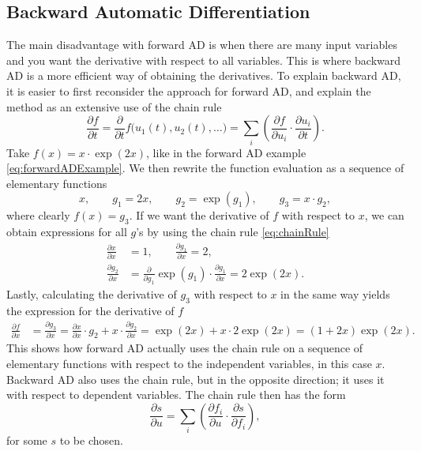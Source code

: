 \subsection{Backward Automatic Differentiation}
\label{sec:BackwardAD}
The main disadvantage with forward AD is when there are many input variables and you want the derivative with respect to all variables. This is where backward AD is a more efficient way of obtaining the derivatives. To explain backward AD, it is easier to first reconsider the approach for forward AD, and explain the method as an extensive use of the chain rule
\begin{equation}
    \label{eq:chainRule}
    \frac{\partial f}{\partial t} = 
    \frac{\partial}{\partial t}f\bigl(u_1(t),u_2(t),\dots\bigr)=
    \sum_i\left(\frac{\partial f}{\partial u_i}\cdot\frac{\partial u_i}{\partial t}\right).
\end{equation}
Take $f(x) = x\cdot\exp(2x)$, like in the forward AD example \eqref{eq:forwardADExample}. We then rewrite the function evaluation as a sequence of elementary functions
\begin{equation}
    \label{eq:BackwardADSeperationSimple}
    x, \hspace{2em} g_1 = 2x, \hspace{2em} g_2 = \exp(g_1), \hspace{2em} g_3 = x\cdot g_2,
\end{equation}
where clearly $f(x) = g_3$. If we want the derivative of $f$ with respect to $x$, we can obtain expressions for all $g$'s by using the chain rule \eqref{eq:chainRule}
\begin{align*}
     \frac{\partial x}{\partial x} &= 1, \qquad
     \frac{\partial g_1}{\partial x} = 2, \\
     \frac{\partial g_2}{\partial x} &= \frac{\partial}{\partial g_1}\exp(g_1)\cdot\frac{\partial g_1}{\partial x} = 2\exp(2x).
\end{align*}
Lastly, calculating the derivative of $g_3$ with respect to $x$ in the same way yields the expression for the derivative of $f$
\begin{align*}
    \frac{\partial f}{\partial x} &= \frac{\partial g_3}{\partial x}%
    =\frac{\partial x}{\partial x}\cdot g_2 + x\cdot\frac{\partial g_2}{\partial x}%
    = \exp(2x) + x\cdot 2\exp(2x)%
    = (1+2x)\exp(2x).
\end{align*}
This shows how forward AD actually uses the chain rule on a sequence of elementary functions with respect to the independent variables, in this case $x$. Backward AD also uses the chain rule, but in the opposite direction; it uses it with respect to dependent variables. The chain rule then has the form
\begin{equation}
    \label{eq:chainRuleReverse}
    \frac{\partial s}{\partial u} = \sum_i\left(\frac{\partial f_i}{\partial u}\cdot\frac{\partial s}{\partial f_i}\right),
\end{equation}
for some $s$ to be chosen.

